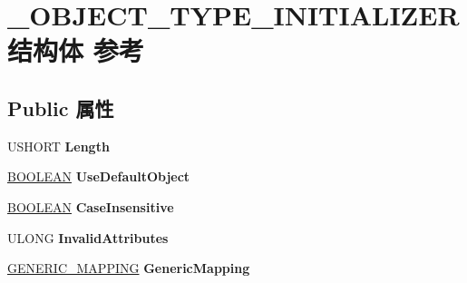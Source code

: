 \hypertarget{struct___o_b_j_e_c_t___t_y_p_e___i_n_i_t_i_a_l_i_z_e_r}{}\section{\+\_\+\+O\+B\+J\+E\+C\+T\+\_\+\+T\+Y\+P\+E\+\_\+\+I\+N\+I\+T\+I\+A\+L\+I\+Z\+E\+R结构体 参考}
\label{struct___o_b_j_e_c_t___t_y_p_e___i_n_i_t_i_a_l_i_z_e_r}
\subsection*{Public 属性}
\begin{DoxyCompactItemize}
\item 
\mbox{\label{struct___o_b_j_e_c_t___t_y_p_e___i_n_i_t_i_a_l_i_z_e_r_af54a5f1bbe22d1377d041ebc10204669}} 
U\+S\+H\+O\+RT {\bfseries Length}
\item 
\mbox{\label{struct___o_b_j_e_c_t___t_y_p_e___i_n_i_t_i_a_l_i_z_e_r_ad28b09d9a837c9fdc8851466bf1c96cc}} 
\hyperlink{_processor_bind_8h_a112e3146cb38b6ee95e64d85842e380a}{B\+O\+O\+L\+E\+AN} {\bfseries Use\+Default\+Object}
\item 
\mbox{\label{struct___o_b_j_e_c_t___t_y_p_e___i_n_i_t_i_a_l_i_z_e_r_a2a6190c378774e4a068a8a5e402c1f8f}} 
\hyperlink{_processor_bind_8h_a112e3146cb38b6ee95e64d85842e380a}{B\+O\+O\+L\+E\+AN} {\bfseries Case\+Insensitive}
\item 
\mbox{\label{struct___o_b_j_e_c_t___t_y_p_e___i_n_i_t_i_a_l_i_z_e_r_a93c471c04c635310ca48d45145a13a56}} 
U\+L\+O\+NG {\bfseries Invalid\+Attributes}
\item 
\mbox{\label{struct___o_b_j_e_c_t___t_y_p_e___i_n_i_t_i_a_l_i_z_e_r_a5ce702094461e265e1ddf334e5433947}} 
\hyperlink{struct___g_e_n_e_r_i_c___m_a_p_p_i_n_g}{G\+E\+N\+E\+R\+I\+C\+\_\+\+M\+A\+P\+P\+I\+NG} {\bfseries Generic\+Mapping}
\item 
\mbox{\label{struct___o_b_j_e_c_t___t_y_p_e___i_n_i_t_i_a_l_i_z_e_r_a007f8354c86d0da4734454eaf26e5448}} 

\end{DoxyCompactItemize}
